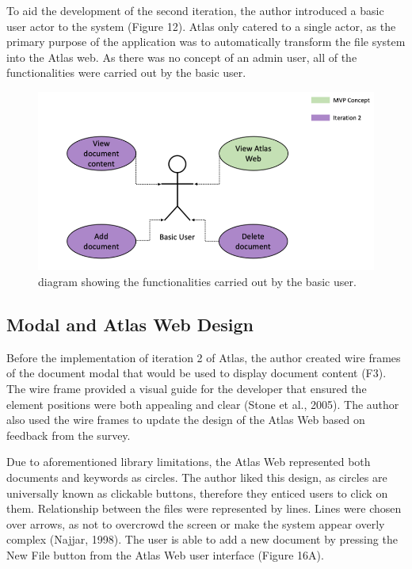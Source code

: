 \documentclass{article}
\begin{document}
To aid the development of the second iteration, the author introduced a basic user actor to the system (Figure 12). Atlas only catered to a single actor, as the primary purpose of the application was to automatically transform the file system into the Atlas web. As there was no concept of an admin user, all of the functionalities were carried out by the basic user.

\begin{figure}[!htb]
  \centering
      \includegraphics[width=1\textwidth]{images/actor-diagram.png}
  \caption{diagram showing the functionalities carried out by the basic user.}
\end{figure}

\subsection{Modal and Atlas Web Design}

Before the implementation of iteration 2 of Atlas, the author created wire frames of the document modal that would be used to display document content (F3). The wire frame provided a visual guide for the developer that ensured the element positions were both appealing and clear (Stone et al., 2005). The author also used the wire frames to update the design of the Atlas Web based on feedback from the survey.

Due to aforementioned library limitations, the Atlas Web represented both documents and keywords as circles. The author liked this design, as circles are universally known as clickable buttons, therefore they enticed  users to click on them. Relationship between the files were represented by lines. Lines were chosen over arrows, as not to overcrowd the screen or make the system appear overly complex (Najjar, 1998). The user is able to add a new document by pressing the New File button from the Atlas Web user interface (Figure 16A). 
\end{document}
